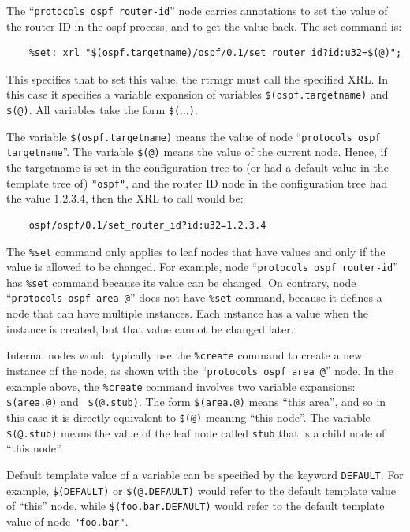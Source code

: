\documentclass[11pt]{article}
\begin{document}
The ``{\tt protocols ospf router-id}'' node carries annotations to set
the value of the router ID in the ospf process, and to get the value
back.  The set command is:
\begin{verbatim}
    %set: xrl "$(ospf.targetname)/ospf/0.1/set_router_id?id:u32=$(@)";
\end{verbatim}
This specifies that to set this value, the rtrmgr must call the
specified XRL.  In this case it specifies a variable expansion of
variables {\tt \$(ospf.targetname)} and  {\tt \$(@)}.  All variables take the
form {\tt \$(}...{\tt )}.

The variable {\tt \$(ospf.targetname)} means the value of node
``{\tt protocols ospf targetname}''.
The variable {\tt \$(@)} means the value of the current node.
Hence, if the targetname is set in the configuration tree to (or had a default
value in the template tree of) {\tt "ospf"}, and the router ID node in the
configuration tree had the value 1.2.3.4, then the XRL to call would be:

\begin{verbatim}
    ospf/ospf/0.1/set_router_id?id:u32=1.2.3.4
\end{verbatim}

The {\tt \%set} command only applies to leaf nodes that have values and only
if the value is allowed to be changed.
For example, node ``{\tt protocols ospf router-id}'' has {\tt \%set} command
because its value can be changed.
On contrary, node ``{\tt protocols ospf area @}'' does not have
{\tt \%set} command, because it defines a node that can have multiple
instances. Each instance has a value when the instance is created, but that
value cannot be changed later.

Internal nodes would typically use the {\tt \%create} command to
create a new instance of the node, as shown with the ``{\tt protocols ospf
area @}'' node.  In the example above, the {\tt \%create} command
involves two variable expansions: {\tt \$(area.@)} and {\tt
\$(@.stub)}.  The form {\tt \$(area.@)} means ``this area'', and so
in this case it is directly equivalent to {\tt \$(@)} meaning ``this node''.
The variable {\tt \$(@.stub)} means the value of the leaf node called
{\tt stub} that is a child node of ``this node''.

Default template value of a variable can be specified by the keyword
{\tt DEFAULT}. For example, {\tt \$(DEFAULT)} or {\tt \$(@.DEFAULT)}
would refer to the default template value of ``this'' node, while
{\tt \$(foo.bar.DEFAULT)} would refer to the default template value
of node {\tt "foo.bar"}.
\end{document}
